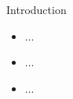 
\begin{frame}{Introduction}

\begin{itemize}
    \item ...
    \item ...
    \item ...
\end{itemize}

\end{frame}

